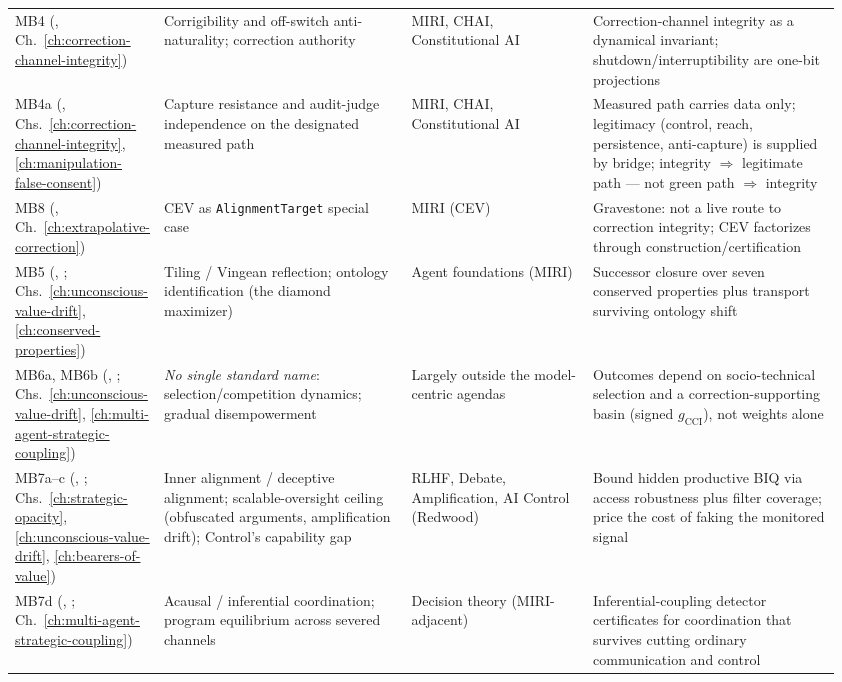 \begin{landscape}
\begin{longtable}{@{}L{0.14\linewidth}L{0.30\linewidth}L{0.22\linewidth}L{0.30\linewidth}@{}}
MB4 \newline (, Ch.~\ref{ch:correction-channel-integrity}) & Corrigibility and off-switch anti-naturality; correction authority & MIRI, CHAI, Constitutional AI & Correction-channel integrity as a dynamical invariant; shutdown/interruptibility are one-bit projections \\
MB4a \newline (, Chs.~\ref{ch:correction-channel-integrity}, \ref{ch:manipulation-false-consent}) & Capture resistance and audit-judge independence on the designated measured path & MIRI, CHAI, Constitutional AI & Measured path carries data only; legitimacy (control, reach, persistence, anti-capture) is supplied by bridge; integrity \(\Rightarrow\) legitimate path --- not green path \(\Rightarrow\) integrity \\
MB8 \newline (, Ch.~\ref{ch:extrapolative-correction}) & CEV as \texttt{AlignmentTarget} special case & MIRI (CEV) & Gravestone: not a live route to correction integrity; CEV factorizes through construction/certification \\
MB5 \newline (, ; Chs.~\ref{ch:unconscious-value-drift}, \ref{ch:conserved-properties}) & Tiling / Vingean reflection; ontology identification (the diamond maximizer) & Agent foundations (MIRI) & Successor closure over seven conserved properties plus transport surviving ontology shift \\
MB6a, MB6b \newline (, ; Chs.~\ref{ch:unconscious-value-drift}, \ref{ch:multi-agent-strategic-coupling}) & \emph{No single standard name}: selection/competition dynamics; gradual disempowerment & Largely outside the model-centric agendas & Outcomes depend on socio-technical selection and a correction-supporting basin (signed \(g_{\mathrm{CCI}}\)), not weights alone \\
MB7a--c \newline (, ; Chs.~\ref{ch:strategic-opacity}, \ref{ch:unconscious-value-drift}, \ref{ch:bearers-of-value}) & Inner alignment / deceptive alignment; scalable-oversight ceiling (obfuscated arguments, amplification drift); Control's capability gap & RLHF, Debate, Amplification, AI Control (Redwood) & Bound hidden productive BIQ via access robustness plus filter coverage; price the cost of faking the monitored signal \\
MB7d \newline (, ; Ch.~\ref{ch:multi-agent-strategic-coupling}) & Acausal / inferential coordination; program equilibrium across severed channels & Decision theory (MIRI-adjacent) & Inferential-coupling detector certificates for coordination that survives cutting ordinary communication and control \\

\end{longtable}
\end{landscape}
